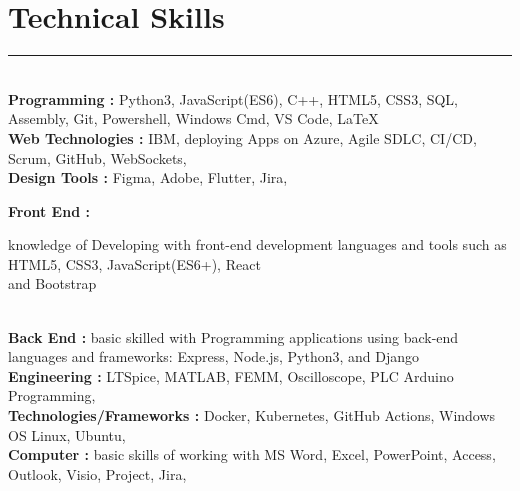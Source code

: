 \documentclass[12pt]{article}
\begin{document}
\vspace{-3mm}\section*{\fontsize{14}{1}\selectfont\color{color_29791}Technical Skills}\vspace{-9pt} 
\rule{\textwidth}{0.4pt}
\vspace{2pt}
\\{\fontsize{9}{1}\selectfont\color{color_29791}\hspace{5mm}\textbf{Programming :} Python3, JavaScript(ES6), C++, HTML5, CSS3, SQL, Assembly, Git, Powershell, Windows Cmd, VS Code, LaTeX}
\\{\fontsize{9}{1}\selectfont\color{color_29791}\hspace{5mm}\textbf{Web Technologies :} IBM, deploying Apps on Azure, Agile SDLC, CI/CD, Scrum, GitHub, WebSockets,}
\\{\fontsize{9}{1}\selectfont\color{color_29791}\hspace{5mm}\textbf{Design Tools :} Figma, Adobe, Flutter, Jira,}
\\{\fontsize{9}{1}\selectfont\color{color_29791}\hspace{5mm}\textbf{Front End :} \parbox{\textwidth}{\raggedright knowledge of Developing with front-end development languages and tools such as HTML5, CSS3, JavaScript(ES6+), React \\ and Bootstrap}}
\\{\fontsize{9}{1}\selectfont\color{color_29791}\hspace{5mm}\textbf{Back End :} basic skilled with Programming applications using back-end languages and frameworks: Express, Node.js, Python3, and Django}
\\{\fontsize{9}{1}\selectfont\color{color_29791}\hspace{5mm}\textbf{Engineering :} LTSpice, MATLAB, FEMM, Oscilloscope, PLC Arduino Programming,}
\\{\fontsize{9}{1}\selectfont\color{color_29791}\hspace{5mm}\textbf{Technologies/Frameworks :} Docker, Kubernetes, GitHub Actions, Windows OS Linux, Ubuntu,}
\\{\fontsize{9}{1}\selectfont\color{color_29791}\hspace{5mm}\textbf{Computer :} basic skills of working with MS Word, Excel, PowerPoint, Access, Outlook, Visio, Project, Jira,}
\end{document}
